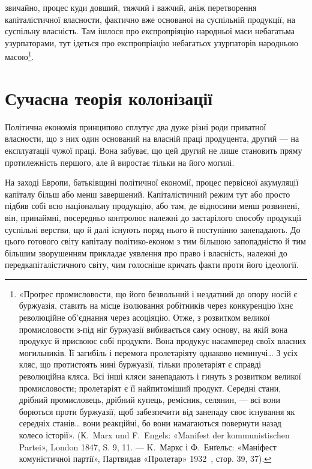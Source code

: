 \parcont{}  %
звичайно, процес куди довший, тяжчий і важчий, аніж перетворення
капіталістичної власности, фактично вже основаної на суспільній
продукції, на суспільну власність. Там ішлося про експропріяцію
народньої маси небагатьма узурпаторами, тут ідеться
про експропріацію небагатьох узурпаторів народньою масою\footnote{
«Проґрес промисловости, що його безвольний і нездатний до
опору носій є буржуазія, ставить на місце ізолювання робітників через
конкуренцію їхнє революційне об’єднання через асоціяцію. Отже, з розвитком
великої промисловости з-під ніг буржуазії вибивається саму основу,
на якій вона продукує й присвоює собі продукти. Вона продукує насамперед
своїх власних могильників. Її загибіль і перемога пролетаріяту
однаково неминучі\dots{} З усіх кляс, що протистоять нині буржуазії, тільки
пролетаріят є справді революційна кляса. Всі інші кляси занепадають і
гинуть з розвитком великої промисловости; пролетаріят є її найпитоміший
продукт. Середні стани, дрібний промисловець, дрібний купець, ремісник,
селянин, — всі вони борються проти буржуазії, щоб забезпечити від
занепаду своє існування як середніх станів\dots{} вони реакційні, бо вони
намагаються повернути назад колесо історії». (К.~Marx und F.~Engels:
«Manifest der kommunistischen Partei», London 1847, S. 9, 11. — K.~Маркс
і Ф.~Енґельс: «Маніфест комуністичної партії», Партвидав «Пролетар»
1932~, стор. 39, 37).
}.

\section[Сучасна теорія колонізації]{Сучасна теорія колонізації\footnotemark{}}

\vspace{-\bigskipamount} %
Політична економія принципово сплутує два дуже різні
роди приватної власности, що з них один оснований на власній
праці продуцента, другий — на експлуатації чужої праці.
Вона забуває, що цей другий не лише становить пряму протилежність
першого, але й виростає тільки на його могилі.

На заході Европи, батьківщині політичної економії, процес
первісної акумуляції капіталу більш або менш завершений.
Капіталістичний режим тут або просто підбив собі всю національну
продукцію, або там, де відносини менш розвинені, він, принаймні,
посередньо контролює належні до застарілого способу
продукції суспільні верстви, що й далі існують поряд нього й
поступінно занепадають. До цього готового світу капіталу політико-економ
з тим більшою запопадністю й тим більшим
зворушенням прикладає уявлення про право і власність, належні
до передкапіталістичного світу, чим голосніше кричать
факти проти його ідеології.

